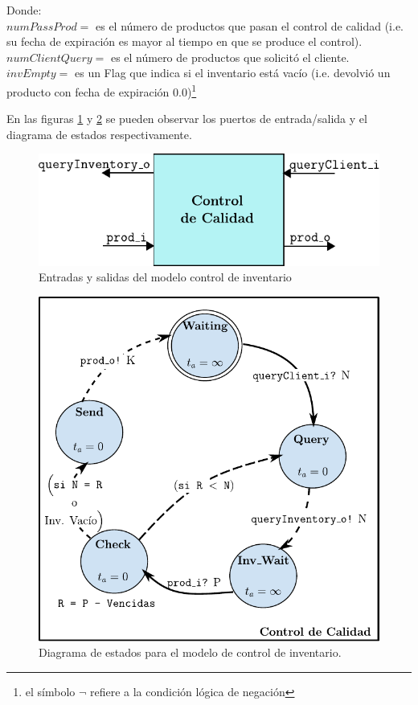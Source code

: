 \documentclass[10pt]{article}
\begin{document}
Donde:\\
$numPassProd = $ es el número de productos que pasan el control de calidad (i.e. su fecha de expiración es mayor al tiempo en que se produce el control).\\
$numClientQuery = $ es el número de productos que solicitó el cliente.\\
$invEmpty = $ es un Flag que indica si el inventario está vacío (i.e. devolvió un producto con fecha de expiración $0.0$)\footnote{el símbolo $\neg$ refiere a la condición lógica de negación}

En las figuras \ref{fig:CC-esquematico} y \ref{fig:CC-estados} se pueden observar los puertos de entrada/salida y el diagrama de estados respectivamente.

\begin{figure}[htbp]
	\centering
	\includegraphics{img/CC-esquematico}
	\caption{Entradas y salidas del modelo control de inventario}
	\label{fig:CC-esquematico}
\end{figure}

\begin{figure}[htbp]
	\centering
	\includegraphics{img/controlCalidaddevsgraph}
	\caption{Diagrama de estados para el modelo de control de inventario.}
	\label{fig:CC-estados}
\end{figure}
\end{document}
